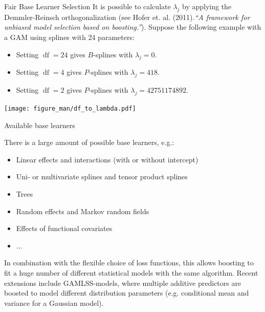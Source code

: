 \begin{vbframe}{Fair Base Learner Selection}
It is possible to calculate $\lambda_j$ by applying the Demmler-Reinsch orthogonalization (see Hofer et. al. (2011).\textit{\enquote{A framework for unbiased model selection based on boosting.}}). Suppose the following example with a GAM using splines with 24 parameters:
\begin{itemize}

  \item
    Setting $\operatorname{df} = 24$ gives $B$-splines with $\lambda_j = 0$.

  \item
    Setting $\operatorname{df} = 4$ gives $P$-splines with $\lambda_j = 418$.

  \item
    Setting $\operatorname{df} = 2$ gives $P$-splines with $\lambda_j = 42751174892$.

\end{itemize}

\begin{center}
\texttt{[image: figure\_man/df\_to\_lambda.pdf]}
\end{center}

\end{vbframe}

\begin{vbframe}{Available base learners}

There is a large amount of possible base learners, e.g.:

\begin{itemize}
  \item Linear effects and interactions (with or without intercept)
  \item Uni- or multivariate splines and tensor product splines
  \item Trees
  \item Random effects and Markov random fields
  \item Effects of functional covariates
  \item ...
\end{itemize}

\lz

In combination with the flexible choice of loss functions, this allows boosting to fit  a huge number of different statistical models with the same algorithm. Recent extensions include GAMLSS-models, where multiple additive predictors are boosted to model different distribution parameters (e.g. conditional mean and variance for a Gaussian model).

\end{vbframe}



